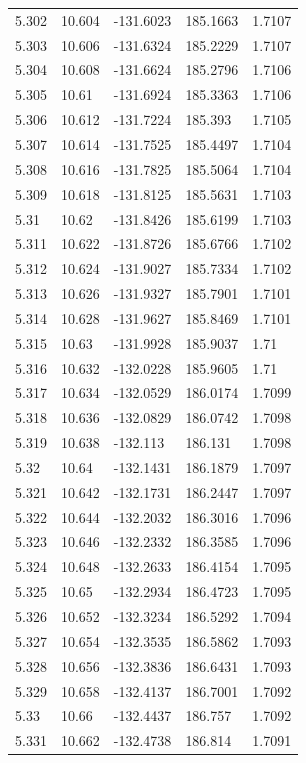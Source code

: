 \begin{tabular}{lllll}
5.302 & 10.604 & -131.6023 & 185.1663 & 1.7107 \\
5.303 & 10.606 & -131.6324 & 185.2229 & 1.7107 \\
5.304 & 10.608 & -131.6624 & 185.2796 & 1.7106 \\
5.305 & 10.61 & -131.6924 & 185.3363 & 1.7106 \\
5.306 & 10.612 & -131.7224 & 185.393 & 1.7105 \\
5.307 & 10.614 & -131.7525 & 185.4497 & 1.7104 \\
5.308 & 10.616 & -131.7825 & 185.5064 & 1.7104 \\
5.309 & 10.618 & -131.8125 & 185.5631 & 1.7103 \\
5.31 & 10.62 & -131.8426 & 185.6199 & 1.7103 \\
5.311 & 10.622 & -131.8726 & 185.6766 & 1.7102 \\
5.312 & 10.624 & -131.9027 & 185.7334 & 1.7102 \\
5.313 & 10.626 & -131.9327 & 185.7901 & 1.7101 \\
5.314 & 10.628 & -131.9627 & 185.8469 & 1.7101 \\
5.315 & 10.63 & -131.9928 & 185.9037 & 1.71 \\
5.316 & 10.632 & -132.0228 & 185.9605 & 1.71 \\
5.317 & 10.634 & -132.0529 & 186.0174 & 1.7099 \\
5.318 & 10.636 & -132.0829 & 186.0742 & 1.7098 \\
5.319 & 10.638 & -132.113 & 186.131 & 1.7098 \\
5.32 & 10.64 & -132.1431 & 186.1879 & 1.7097 \\
5.321 & 10.642 & -132.1731 & 186.2447 & 1.7097 \\
5.322 & 10.644 & -132.2032 & 186.3016 & 1.7096 \\
5.323 & 10.646 & -132.2332 & 186.3585 & 1.7096 \\
5.324 & 10.648 & -132.2633 & 186.4154 & 1.7095 \\
5.325 & 10.65 & -132.2934 & 186.4723 & 1.7095 \\
5.326 & 10.652 & -132.3234 & 186.5292 & 1.7094 \\
5.327 & 10.654 & -132.3535 & 186.5862 & 1.7093 \\
5.328 & 10.656 & -132.3836 & 186.6431 & 1.7093 \\
5.329 & 10.658 & -132.4137 & 186.7001 & 1.7092 \\
5.33 & 10.66 & -132.4437 & 186.757 & 1.7092 \\
5.331 & 10.662 & -132.4738 & 186.814 & 1.7091 \\

\end{tabular}
